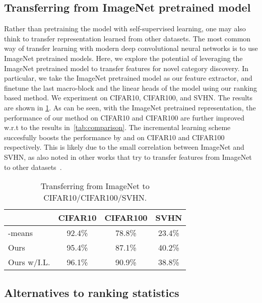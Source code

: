 \subsection{Transferring from ImageNet pretrained model}
\label{s:results_transfer_imagenet}
Rather than pretraining the model with self-supervised learning, one may also think to transfer representation learned from other datasets. The most common way of transfer learning with modern deep convolutional neural networks is to use ImageNet pretrained models. Here, we explore the potential of leveraging the ImageNet pretrained model to transfer features for novel category discovery. In particular, we take the ImageNet pretrained model as our feature extractor, and finetune the last macro-block and the linear heads of the model using our ranking based method. We experiment on CIFAR10, CIFAR100, and SVHN. The results are shown in \cref{tab:imagenet_transfer}. As can be seen, with the ImageNet pretrained representation, the performance of our method on CIFAR10 and CIFAR100 are further improved w.r.t to the results in~\cref{tab:comparison}. The incremental learning scheme succesfully boosts the performance by  and  on CIFAR10 and CIFAR100 respectively. 
This is likely due to the small correlation between ImageNet and SVHN, as also noted in other works that try to transfer features from ImageNet to other datasets~\cite{han2019learning,oliver2018realistic}.

\begin{table}[h!]
\centering
\footnotesize
\caption{Transferring from ImageNet to CIFAR10/CIFAR100/SVHN.}\label{tab:imagenet_transfer}
\begin{tabular}{lccc}
\toprule
& CIFAR10 & CIFAR100 & SVHN  \\
\midrule
-means~\cite{MackQueen67_Kmeans} &92.4\%  & 78.8\% & 23.4\% \\
Ours &95.4\% &87.1\% &40.2\% \\
Ours w/I.L. & 96.1\%  & 90.9\% & 38.8\% \\
\bottomrule
\end{tabular}
\end{table}

\subsection{Alternatives to ranking statistics}

